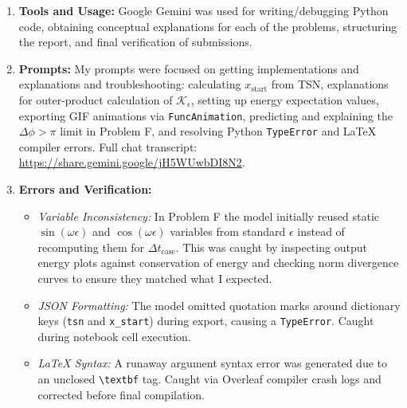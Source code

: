 \documentclass[11pt]{article}
\begin{document}
\begin{enumerate}
    \item \textbf{Tools and Usage:} Google Gemini was used for writing/debugging Python code, obtaining conceptual explanations for each of the problems, structuring the report, and final verification of submissions.

    \item \textbf{Prompts:} My prompts were focused on getting implementations and explanations and troubleshooting: calculating $x_{\text{start}}$ from TSN, explanations for outer-product calculation of $\mathcal{K}_\epsilon$, setting up energy expectation values, exporting GIF animations via \texttt{FuncAnimation}, predicting and explaining the $\Delta \phi > \pi$ limit in Problem F, and resolving Python \texttt{TypeError} and LaTeX compiler errors. Full chat transcript: \url{https://share.gemini.google/jH5WUwbDI8N2}.
    
    \item \textbf{Errors and Verification:} 
    \begin{itemize}
        \item \textit{Variable Inconsistency:} In Problem F the model initially reused static $\sin(\omega \epsilon)$ and $\cos(\omega \epsilon)$ variables from standard $\epsilon$ instead of recomputing them for $\Delta t_{\text{case}}$. This was caught by inspecting output energy plots against conservation of energy and checking norm divergence curves to ensure they matched what I expected.
        \item \textit{JSON Formatting:} The model omitted quotation marks around dictionary keys (\texttt{tsn} and \texttt{x\_start}) during export, causing a \texttt{TypeError}. Caught during notebook cell execution.
        \item \textit{LaTeX Syntax:} A runaway argument syntax error was generated due to an unclosed \texttt{\textbackslash textbf} tag. Caught via Overleaf compiler crash logs and corrected before final compilation.
    \end{itemize}
\end{enumerate}
\end{document}
